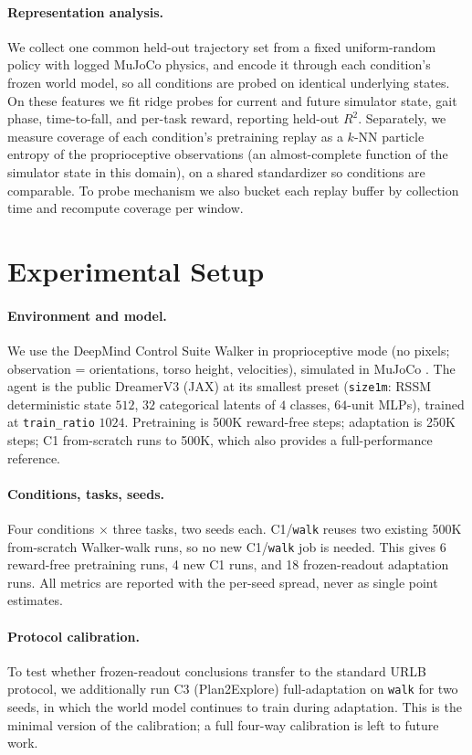 \documentclass{article}
\begin{document}
\paragraph{Representation analysis.}
We collect one common held-out trajectory set from a fixed uniform-random policy
with logged MuJoCo physics, and encode it through each condition's frozen
world model, so all conditions are probed on identical underlying states. On
these features we fit ridge probes for current and future simulator state, gait
phase, time-to-fall, and per-task reward, reporting held-out $R^2$. Separately,
we measure coverage of each condition's pretraining replay as a $k$-NN
particle entropy of the proprioceptive observations (an almost-complete function
of the simulator state in this domain), on a shared standardizer so conditions
are comparable. To probe mechanism we also bucket each replay buffer by
collection time and recompute coverage per window.

\section{Experimental Setup}

\paragraph{Environment and model.}
We use the DeepMind Control Suite \citep{tassa2018dmc} Walker in
proprioceptive mode (no pixels; observation = orientations, torso height,
velocities), simulated in MuJoCo \citep{todorov2012mujoco}. The agent is the
public DreamerV3 (JAX) at its smallest preset (\texttt{size1m}: RSSM
deterministic state $512$, $32$ categorical latents of $4$ classes,
$64$-unit MLPs), trained at \texttt{train\_ratio} $1024$. Pretraining is 500K
reward-free steps; adaptation is 250K steps; C1 from-scratch runs to 500K, which
also provides a full-performance reference.

\paragraph{Conditions, tasks, seeds.}
Four conditions $\times$ three tasks, two seeds each. C1/\texttt{walk} reuses two
existing 500K from-scratch Walker-walk runs, so no new C1/\texttt{walk} job is
needed. This gives 6 reward-free pretraining runs, 4 new C1 runs, and 18
frozen-readout adaptation runs. All metrics are reported with the per-seed
spread, never as single point estimates.

\paragraph{Protocol calibration.}
To test whether frozen-readout conclusions transfer to the standard URLB
protocol, we additionally run C3 (Plan2Explore) full-adaptation on
\texttt{walk} for two seeds, in which the world model continues to train during
adaptation. This is the minimal version of the calibration; a full four-way
calibration is left to future work.
\end{document}
